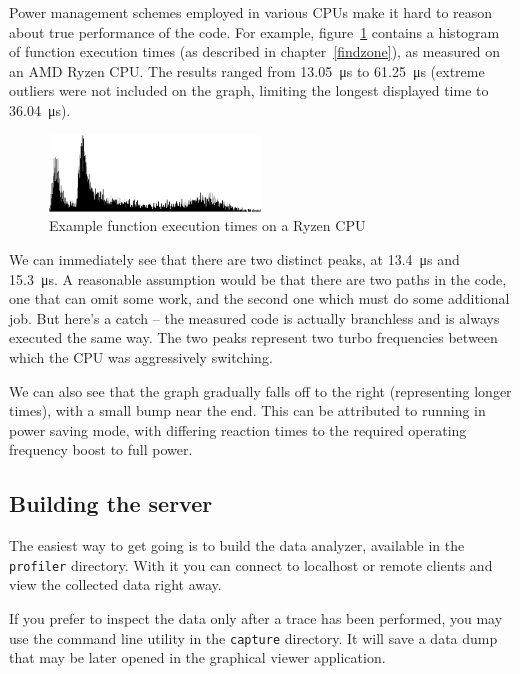 \documentclass[hidelinks,titlepage,a4paper]{article}
\begin{document}
Power management schemes employed in various CPUs make it hard to reason about true performance of the code. For example, figure~\ref{ryzenimage} contains a histogram of function execution times (as described in chapter~\ref{findzone}), as measured on an AMD Ryzen CPU. The results ranged from 13.05~\si{\micro\second} to 61.25~\si{\micro\second} (extreme outliers were not included on the graph, limiting the longest displayed time to 36.04~\si{\micro\second}).

\begin{figure}[h]
\centering
\includegraphics[width=0.5\textwidth]{images/ryzen.png}
\caption{Example function execution times on a Ryzen CPU}
\label{ryzenimage}
\end{figure}

We can immediately see that there are two distinct peaks, at 13.4~\si{\micro\second} and 15.3~\si{\micro\second}. A reasonable assumption would be that there are two paths in the code, one that can omit some work, and the second one which must do some additional job. But here's a catch -- the measured code is actually branchless and is always executed the same way. The two peaks represent two turbo frequencies between which the CPU was aggressively switching.

We can also see that the graph gradually falls off to the right (representing longer times), with a small bump near the end. This can be attributed to running in power saving mode, with differing reaction times to the required operating frequency boost to full power.

\subsection{Building the server}

The easiest way to get going is to build the data analyzer, available in the \texttt{profiler} directory. With it you can connect to localhost or remote clients and view the collected data right away.

If you prefer to inspect the data only after a trace has been performed, you may use the command line utility in the \texttt{capture} directory. It will save a data dump that may be later opened in the graphical viewer application.
\end{document}
